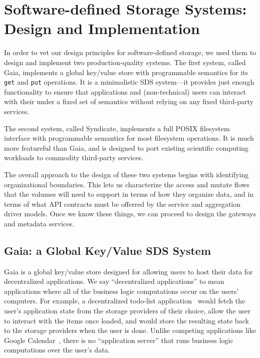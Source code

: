 \chapter{Software-defined Storage Systems: Design and Implementation}
\label{chap:syndicate_sds}

In order to vet our design principles for software-defined storage, we used them
to design and implement two production-quality systems.  The first system,
called Gaia, implements a global key/value store with programmable semantics for its
\texttt{get} and \texttt{put} operations.  It is a minimalistic SDS system---it
provides just enough functionality to ensure that applications and
(non-technical) users can interact with their under a fixed set of 
semantics without relying on any fixed third-party services.

The second system, called Syndicate, implements
a full POSIX filesystem interface with programmable semantics for most
filesystem operations.  It is much more featureful than Gaia, and is designed
to port existing scientific computing workloads to commodity third-party
services.

The overall approach to the design of these two systems begins with identifying
organizational boundaries.  This lets us characterize the access and mutate
flows that the volumes will need to support in terms of how they organize data,
and in terms of what API contracts must be offerred by the service and
aggregation driver models.  Once we know these things, we can proceed to design the
gateways and metadata services.

\section{Gaia: a Global Key/Value SDS System}

Gaia is a global key/value store designed for allowing users to host their data
for decentralized applications.  We say ``decentralized applications'' to mean
applications where all of the business logic computations occur on the
users' computers.  For example, a decentralized todo-list
application~\cite{blockstack-todo} would fetch the user's application state from
the storage providers of their choice, allow the user to interact with the items
once loaded, and would store the resulting state back to the storage providers
when the user is done.  Unlike competing applications like Google
Calendar~\cite{google-calendar}, there is no ``application server'' that
runs business logic computations over the user's data.

